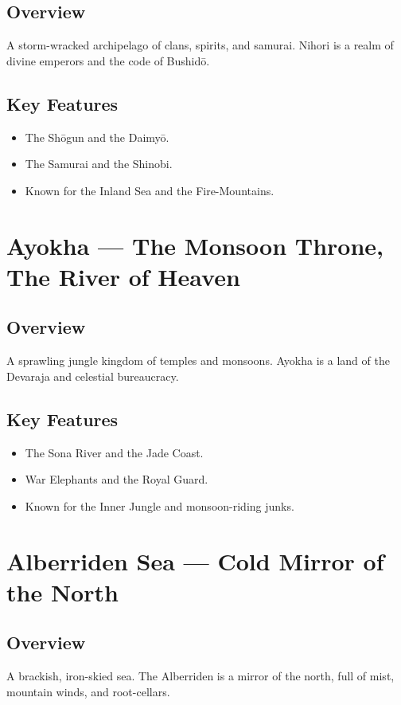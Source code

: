 \subsection*{Overview}
A storm-wracked archipelago of clans, spirits, and samurai. Nihori is a realm of divine emperors and the code of Bushidō.

\subsection*{Key Features}
\begin{itemize}[leftmargin=*]
    \item The Shōgun and the Daimyō.
    \item The Samurai and the Shinobi.
    \item Known for the Inland Sea and the Fire-Mountains.
\end{itemize}

\section{Ayokha — The Monsoon Throne, The River of Heaven}
\label{sec:lore-ayokha}

\subsection*{Overview}
A sprawling jungle kingdom of temples and monsoons. Ayokha is a land of the Devaraja and celestial bureaucracy.

\subsection*{Key Features}
\begin{itemize}[leftmargin=*]
    \item The Sona River and the Jade Coast.
    \item War Elephants and the Royal Guard.
    \item Known for the Inner Jungle and monsoon-riding junks.
\end{itemize}

\section{Alberriden Sea — Cold Mirror of the North}
\label{sec:lore-alberriden}

\subsection*{Overview}
A brackish, iron-skied sea. The Alberriden is a mirror of the north, full of mist, mountain winds, and root-cellars.

